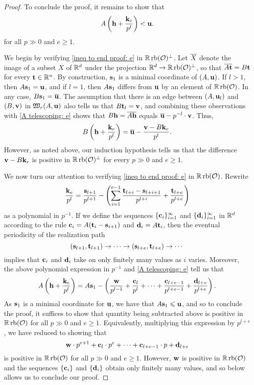 \documentclass[11pt]{amsart}
\begin{document}
\begin{proof}
To conclude the proof, it remains to show that 
%
\begin{equation} 
\label{ineq to end proof: e}
A \left( \mathbf{h} + \frac{\mathbf{k}_e}{p^l} \right) < \mathbf{u}. 
\end{equation}
%
for all $p \gg 0$ and $e \geq 1$.

We begin by verifying \eqref{ineq to end proof: e} in $\mathbb{R} \operatorname{rb}(\mathcal{O})^{\perp}$.  Let $\overline{X}$ denote the image of a subset $X$ of $\mathbb{R}^d$ under the projection $\mathbb{R}^d \to \mathbb{R} \operatorname{rb}(\mathcal{O})^{\perp}$, so that $\overline{A \mathbf{t}} = B \mathbf{t}$ for every $\mathbf{t} \in \mathbb{R}^n$.    By construction, $\mathbf{s}_1$ is a minimal coordinate of $(A, \mathbf{u})$.  If $l > 1$, then $A \mathbf{s}_1 = \mathbf{u}$, and if $l =1$, then $A \mathbf{s}_1$ differs from $\mathbf{u}$ by an element of $\mathbb{R} \operatorname{rb}(\mathcal{O})$.  In any case, $B \mathbf{s}_1 = \overline{\mathbf{u}}$.   The assumption that there is an edge  between $(A, \mathbf{u}_l)$ and $(B, \mathbf{v})$ in $\mathfrak{W}_r(A, \mathbf{u})$ also tells us that $B \mathbf{t}_l = \mathbf{v}$, and combining these observations with \eqref{A telescoping: e} shows that
$B \mathbf{h} = \overline{A \mathbf{h}}$ equals $\overline{\mathbf{u}} - p^{-l} \cdot \mathbf{v}$.  Thus, 
\[  B \left( \mathbf{h} + \frac{\mathbf{k}_e}{p^l} \right) = \overline{\mathbf{u}} -  \frac{\mathbf{v} - B \mathbf{k}_e}{p^l}. \]
However, as noted above, our induction hypothesis tells us that the difference  $\mathbf{v} - B \mathbf{k}_e$ is positive in $\mathbb{R} \operatorname{rb}(\mathcal{O})^{\perp}$ for every $p \gg 0$ and $e \geq 1$.    

We now turn our attention to verifying \eqref{ineq to end proof: e} in $\mathbb{R} \operatorname{rb}(\mathcal{O})$.   Rewrite
\[ \frac{\mathbf{k}_e}{p^l} = \frac{\mathbf{s}_{l+1}}{p^{l+1}}- \left ( \sum_{i=1}^{e-1} \frac{ \mathbf{t}_{l+i} - \mathbf{s}_{l+i+1}}{p^{l+i}}  + \frac{ \mathbf{t}_{l+e}}{p^{l+e}} \right) \] as a polynomial in $p^{-1}$.  If we define the sequences $\{ \mathbf{c}_i \}_{i=1}^{\infty}$ and $\{ \mathbf{d}_i \}_{i=1}^{\infty}$ in $\mathbb{R}^d$ according to the rule $\mathbf{c}_i = A ( \mathbf{t}_i - \mathbf{s}_{i+1})$ and $\mathbf{d}_i = A \mathbf{t}_i$, then the eventual periodicity of the realization path 
\[ (\mathbf{s}_{l+1}, \mathbf{t}_{l+1}) \to \cdots \to (\mathbf{s}_{l+e}, \mathbf{t}_{l+e}) \to \cdots \] implies that $\mathbf{c}_i$ and $\mathbf{d}_i$ take on only finitely many values as $i$ varies.    Moreover, the above polynomial expression in $p^{-1}$ and \eqref{A telescoping: e} tell us that 
%
\[ A \left( \mathbf{h} + \frac{\mathbf{k}_e}{p^l} \right)  =  A \mathbf{s}_1 - \left( \frac{\mathbf{w}}{p^{l-1}} + \frac{ \mathbf{c}_{l}}{p^{l}} + \cdots +  \frac{ \mathbf{c}_{l+e-1}}{p^{l+e-1}} + \frac{\mathbf{d}_{l+e}}{p^{l+e}} \right).  \] 
%
As $\mathbf{s}_1$ is a minimal coordinate for $\mathbf{u}$, we have that $A \mathbf{s}_1 \leqslant \mathbf{u}$, and so to conclude the proof, it suffices to show that quantity being subtracted above is positive in $\mathbb{R} \operatorname{rb}(\mathcal{O})$ for all $p \gg 0$ and $e \geq 1$.  Equivalently, multiplying this expression by $p^{l+e}$, we have reduced to showing that 
\[ \mathbf{w} \cdot p^{e+1} + \mathbf{c}_l \cdot p^{e} + \cdots + \mathbf{c}_{l+e-1} \cdot p + \mathbf{d}_{l+e} \] is positive in $\mathbb{R} \operatorname{rb}(\mathcal{O})$ for all $p \gg 0$ and $e \geq 1$.  However, $\mathbf{w}$ is positive in $\mathbb{R} \operatorname{rb}(\mathcal{O})$ and the sequences $\{ \mathbf{c}_i \}$ and $\{ \mathbf{d}_i \}$ obtain only finitely many values, and so  below allows us to conclude our proof.

\end{proof}
\end{document}

